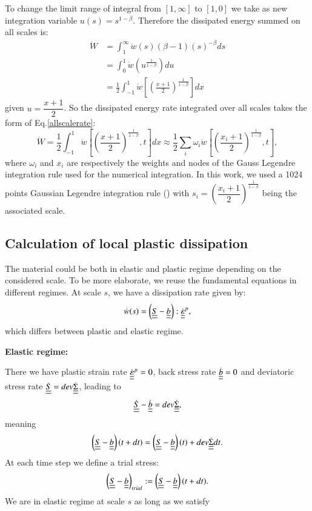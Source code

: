 \documentclass[3p,times,procedia,number]{elsarticle}
\begin{document}
\noindent
To change the limit range of integral from $[1,\infty]$ to $[1,0]$ we take as new integration variable
$u(s)= s^{1-\beta}$. Therefore the dissipated energy summed on all scales is:
\begin{equation}
\begin{split}
\dot{W}&=\int_{1}^{\infty}\dot{w}(s) (\beta-1)(s)^{-\beta}ds
\\&=\int_{0}^{1}\dot{w}\left( u^{\frac{1}{1-\beta}}\right)du
\\&=\frac{1}{2}\int_{-1}^{1}\dot{w}\left[  \left( \frac{x+1}{2}\right) ^{\frac{1}{1-\beta}}\right] dx
\end{split}
\label{allscale}
\end{equation}
given $u=\dfrac{x+1}{2}$. So the dissipated energy rate integrated over all scales takes the form of Eq.\eqref{allscalerate}:
\begin{equation}
\dot{W}=\frac{1}{2}\int_{-1}^{1}\dot{w}\left[  \left( \frac{x+1}{2}\right) ^{\frac{1}{1-\beta}},t\right] dx\approx\frac{1}{2}\sum_{i}\omega_i\dot{w}\left[  \left( \frac{x_i+1}{2}\right) ^{\frac{1}{1-\beta}},t\right],
\label{allscalerate}
\end{equation}
where $\omega_i$ and $x_i$ are respectively the weights and nodes of the Gauss Legendre integration rule used for the numerical integration.  In this work, we used a 1024 points Gaussian Legendre integration rule (\cite{Legendre}) with $s_i=\left( \dfrac{x_i+1}{2}\right) ^{\frac{1}{1-\beta}}$ being the associated scale.

\subsection{Calculation of local plastic dissipation}
\label{sec:5.4.4}
The material could be both in elastic and plastic regime depending on the considered scale. To be more elaborate, we reuse the fundamental equations in different regimes. At scale $s$, we have a dissipation rate given by:
$$\dot{w}(s)=\left( \uline{\uline{S}}-\uline{\uline{b}}\right):\dot{\uline{\uline{\varepsilon}}}^p, $$
which differs between plastic and elastic regime.

\vspace{6pt}
\noindent
\textbf{Elastic regime:}

\vspace{6pt}
\noindent
There we have
plastic strain rate
$\dot{\uline{\uline{\varepsilon}}}^p=0$, back stress rate $\dot{\uline{\uline{b}}}=0$ and deviatoric stress rate $\dot{\uline{\uline{S}}}=dev\dot{\uline{\uline{\Sigma}}}$, leading to
$$\dot{\uline{\uline{S}}}-\dot{\uline{\uline{b}}}=dev\dot{\uline{\uline{\Sigma}}},$$ 
meaning
$$\left( \uline{\uline{S}}-\uline{\uline{b}}\right) (t+dt)=\left( \uline{\uline{S}}-\uline{\uline{b}}\right) (t)+dev\dot{\uline{\uline{\Sigma}}}dt.$$
At each time step we define a trial stress:
\begin{equation}
\left( \uline{\uline{S}}-\uline{\uline{b}}\right)_{trial}:=\left( \uline{\uline{S}}-\uline{\uline{b}}\right)(t+dt).
\label{trial}
\end{equation}
We are in elastic regime at scale $s$ as long as we satisfy
\end{document}
